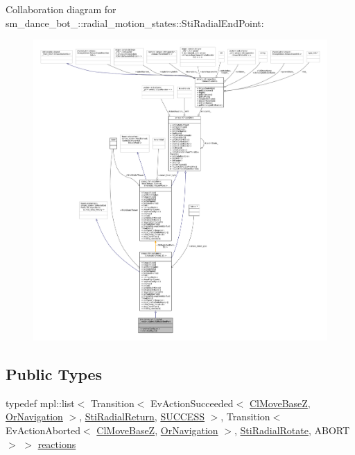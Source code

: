 Collaboration diagram for sm\+\_\+dance\+\_\+bot\+\_\+:\+:radial\+\_\+motion\+\_\+states\+:\+:Sti\+Radial\+End\+Point\+:
\nopagebreak
\begin{figure}[H]
\begin{center}
\leavevmode
\includegraphics[width=350pt]{structsm__dance__bot__3_1_1radial__motion__states_1_1StiRadialEndPoint__coll__graph}
\end{center}
\end{figure}
\subsection*{Public Types}
\begin{DoxyCompactItemize}
\item 
typedef mpl\+::list$<$ Transition$<$ Ev\+Action\+Succeeded$<$ \hyperlink{classmove__base__z__client_1_1ClMoveBaseZ}{Cl\+Move\+BaseZ}, \hyperlink{classsm__dance__bot__3_1_1OrNavigation}{Or\+Navigation} $>$, \hyperlink{structsm__dance__bot__3_1_1radial__motion__states_1_1StiRadialReturn}{Sti\+Radial\+Return}, \hyperlink{classSUCCESS}{S\+U\+C\+C\+E\+SS} $>$, Transition$<$ Ev\+Action\+Aborted$<$ \hyperlink{classmove__base__z__client_1_1ClMoveBaseZ}{Cl\+Move\+BaseZ}, \hyperlink{classsm__dance__bot__3_1_1OrNavigation}{Or\+Navigation} $>$, \hyperlink{structsm__dance__bot__3_1_1radial__motion__states_1_1StiRadialRotate}{Sti\+Radial\+Rotate}, A\+B\+O\+RT $>$ $>$ \hyperlink{structsm__dance__bot__3_1_1radial__motion__states_1_1StiRadialEndPoint_ab1bafa0775ab607c98e9f410224ac5a8}{reactions}
\end{DoxyCompactItemize}
